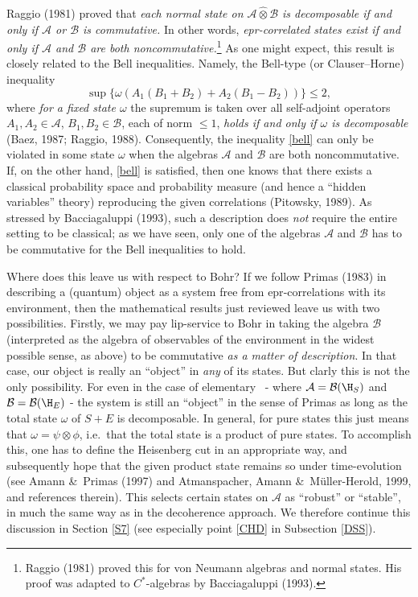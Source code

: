 \documentclass[12pt,titlepage]{article}
\newcommand{\epr}{{\sc epr}}
\newcommand{\beq}{\begin{equation}}
\newcommand{\eeq}{\end{equation}}
\newcommand{\ca}{$C^*$-algebra} \newcommand{\jba}{JB-algebra}
\newcommand{\ot}{\otimes}
\newcommand{\er}{\eqref}
\newcommand{\om}{\omega} \newcommand{\Om}{\Omega}
\newcommand{\CA}{{\mathcal A}} \newcommand{\CB}{{\mathcal B}}
\begin{document}
Raggio (1981) proved  that {\it 
each normal state on $\CA\hat{\otimes}\CB$  is decomposable 
 if and only if  $\CA$ or $\CB$ is commutative.} In other words, {\it \epr-correlated states exist  if and only if  $\CA$ and $\CB$ are both noncommutative.}\footnote{Raggio (1981) proved this for von Neumann algebras and normal states. His proof was adapted to \ca s by Bacciagaluppi (1993).}
As one might expect, this result is closely related to the  Bell inequalities. Namely,
 the Bell-type (or Clauser--Horne) inequality
\beq \sup\{\om(A_1(B_1+B_2)+A_2(B_1-B_2))\} \leq 2, \label{bell}
\eeq
 where {\it for a fixed state $\om$} the supremum is taken over all self-adjoint operators $A_1,A_2\in \CA$, $B_1,B_2\in\CB$, each of norm $\leq 1$, {\it holds if and only if $\om$ is decomposable} (Baez, 1987; Raggio, 1988). 
Consequently, the inequality \er{bell} can only be violated in some state $\om$ when 
 the algebras $\CA$ and $\CB$ are both noncommutative. If, on the other hand, \er{bell} is satisfied, then one knows that there exists a classical probability space and probability measure
(and hence a ``hidden variables'' theory) reproducing the given correlations (Pitowsky, 1989). As stressed by  Bacciagaluppi (1993), such a description does {\it not} require the entire setting to be classical; as we have seen, only one of the algebras $\CA$ and $\CB$ has to be commutative for the  Bell inequalities to hold. 

Where does this leave us with respect to Bohr? If we follow Primas (1983) in 
describing a (quantum) object as a system free from \epr-correlations with its environment, then the mathematical results just reviewed leave us with two possibilities.  Firstly, we may pay lip-service to Bohr in taking the algebra $\CB$ (interpreted as the algebra of observables of the environment in the widest possible sense, as above) to be commutative {\it as a matter of description}. In that case, our object is really an ``object'' in {\it any} of its states. 
 But clarly this  is not the only possibility. For even in the case of elementary \qm\ - where $\CA=\CB(\H_S)$ and $\CB=\CB(\H_E)$ -  the system is still an ``object'' in the sense of Primas as long as the total state
$\om$ of $S+E$ is decomposable. In general, for pure states this just means that $\om=\psi\ot\phi$, i.e.\ that the total state is a product of pure states. To accomplish this, one has to define the Heisenberg cut in an appropriate way, and subsequently hope that
the given product state remains so under time-evolution (see  
Amann \&\ Primas (1997) and Atmanspacher,  Amann \&\  M\"{u}ller-Herold, 1999, and references therein). This selects certain states on $\CA$ as ``robust'' or ``stable'', in much the same way as in the decoherence approach. We therefore continue this discussion in Section \ref{S7} (see especially point \ref{CHD} in Subsection \ref{DSS}).
\end{document}
